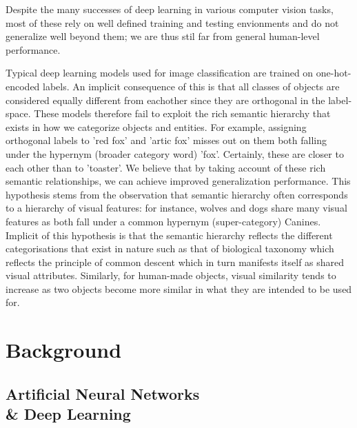\documentclass[12pt]{report}
\begin{document}
Despite the many successes of deep learning in various computer vision tasks, most of these rely on well defined training and testing envionments and do not generalize well beyond them; we are thus stil far from general human-level performance.

Typical deep learning models used for image classification are trained on one-hot-encoded labels. An implicit consequence of this is that all classes of objects are considered equally different from eachother since they are orthogonal in the label-space. These models therefore fail to exploit the rich semantic hierarchy that exists in how we categorize objects and entities. For example, assigning orthogonal labels to 'red fox' and 'artic fox' misses out on them both falling under the hypernym (broader category word) 'fox'. Certainly, these are closer to each other than to 'toaster'. We believe that by taking account of these rich semantic relationships, we can achieve improved generalization performance. This hypothesis stems from the observation that semantic hierarchy often corresponds to a hierarchy of visual features: for instance, wolves and dogs share many visual features as both fall under a common hypernym (super-category) Canines. Implicit of this hypothesis is that the semantic hierarchy reflects the different categorisations that exist in nature such as that of biological taxonomy which reflects the principle of common descent which in turn manifests itself as shared visual attributes. Similarly, for human-made objects, visual similarity tends to increase as two objects become more similar in what they are intended to be used for. 





\newpage

\chapter{Background}

\section{Artificial Neural Networks \\ \& Deep Learning}
\end{document}
